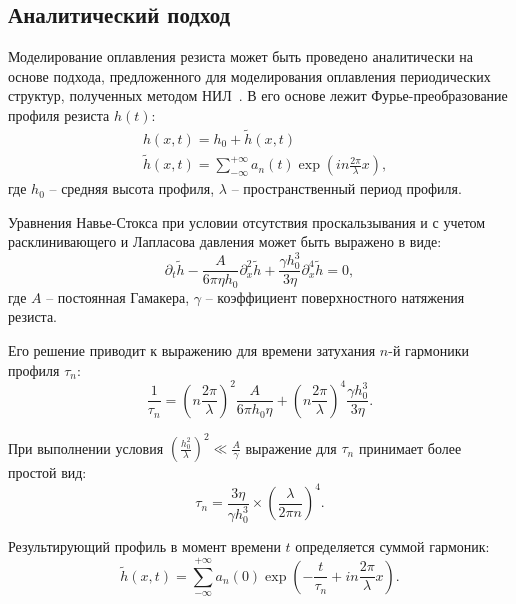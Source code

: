 \subsection{Аналитический подход}
Моделирование оплавления резиста может быть проведено аналитически на основе подхода, предложенного для моделирования оплавления периодических структур, полученных методом НИЛ~\cite{Leveder_2008, Leveder_2011}. В его основе лежит Фурье-преобразование профиля резиста $h(t)$:
\begin{equation}
	\begin{aligned}
		& h(x, t) = h_0 + \tilde{h}(x, t) \\
		& \tilde{h}(x, t) = \sum_{-\infty}^{+\infty} a_n(t) \exp \left(i n \frac{2 \pi}{\lambda} x\right),
	\end{aligned}
\end{equation}
где $h_0$ -- средняя высота профиля, $\lambda$ -- пространственный период профиля.

Уравнения Навье-Стокса при условии отсутствия проскальзывания и с учетом расклинивающего и Лапласова давления может быть выражено в виде:
\begin{equation}
	\partial_t \tilde{h}-\frac{A}{6 \pi \eta h_0} \partial_x^2 \tilde{h}+\frac{\gamma h_0^3}{3 \eta} \partial_x^4 \tilde{h} = 0,
\end{equation}
где $A$ -- постоянная Гамакера, $\gamma$ -- коэффициент поверхностного натяжения резиста.

Его решение приводит к выражению для времени затухания $n$-й гармоники профиля $\tau_n$:
\begin{equation}
	\frac{1}{\tau_n}=\left(n \frac{2 \pi}{\lambda}\right)^2 \frac{A}{6 \pi h_0 \eta}+\left(n \frac{2 \pi}{\lambda}\right)^4 \frac{\gamma h_0^3}{3 \eta}.
\end{equation}

При выполнении условия $\left(\frac{\displaystyle h_0^2}{\displaystyle \lambda}\right)^2 \ll \frac{\displaystyle A}{\displaystyle \gamma}$ выражение для $\tau_n$ принимает более простой вид:
\begin{equation}
	\tau_n=\frac{3 \eta}{\gamma h_0^3} \times\left(\frac{\lambda}{2 \pi n}\right)^4.
\end{equation}

Результирующий профиль в момент времени $t$ определяется суммой гармоник:
\begin{equation}
	\tilde{h}(x, t)=\sum_{-\infty}^{+\infty} a_n(0) \exp \left(-\frac{t}{\tau_n}+i n \frac{2 \pi}{\lambda} x\right).
\end{equation}


